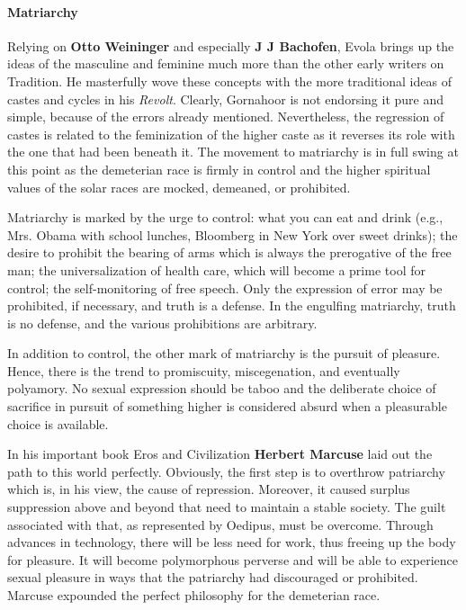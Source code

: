 \paragraph{Matriarchy}


Relying on \textbf{Otto Weininger} and especially \textbf{J J Bachofen}, Evola brings up the ideas of the masculine and feminine much more than the other early writers on Tradition. He masterfully wove these concepts with the more traditional ideas of castes and cycles in his \emph{Revolt}. Clearly, Gornahoor is not endorsing it pure and simple, because of the errors already mentioned. Nevertheless, the regression of castes is related to the feminization of the higher caste as it reverses its role with the one that had been beneath it. The movement to matriarchy is in full swing at this point as the demeterian race is firmly in control and the higher spiritual values of the solar races are mocked, demeaned, or prohibited.

Matriarchy is marked by the urge to control: what you can eat and drink (e.g., Mrs. Obama with school lunches, Bloomberg in New York over sweet drinks); the desire to prohibit the bearing of arms which is always the prerogative of the free man; the universalization of health care, which will become a prime tool for control; the self-monitoring of free speech. Only the expression of error may be prohibited, if necessary, and truth is a defense. In the engulfing matriarchy, truth is no defense, and the various prohibitions are arbitrary.

In addition to control, the other mark of matriarchy is the pursuit of pleasure. Hence, there is the trend to promiscuity, miscegenation, and eventually polyamory. No sexual expression should be taboo and the deliberate choice of sacrifice in pursuit of something higher is considered absurd when a pleasurable choice is available.

In his important book Eros and Civilization \textbf{Herbert Marcuse} laid out the path to this world perfectly. Obviously, the first step is to overthrow patriarchy which is, in his view, the cause of repression. Moreover, it caused surplus suppression above and beyond that need to maintain a stable society. The guilt associated with that, as represented by Oedipus, must be overcome. Through advances in technology, there will be less need for work, thus freeing up the body for pleasure. It will become polymorphous perverse and will be able to experience sexual pleasure in ways that the patriarchy had discouraged or prohibited. Marcuse expounded the perfect philosophy for the demeterian race.


